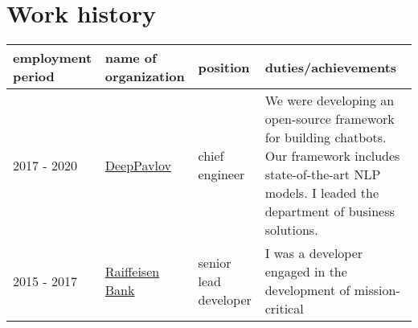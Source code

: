 \documentclass{article}
\begin{document}
\section{Work history}

\begin{longtable}[]{@{}llll@{}}
  \toprule
  \begin{minipage}[b]{0.22\columnwidth}\raggedright
    employment period\strut
  \end{minipage} & \begin{minipage}[b]{0.22\columnwidth}\raggedright
    name of organization\strut
  \end{minipage} & \begin{minipage}[b]{0.22\columnwidth}\raggedright
    position\strut
  \end{minipage} & \begin{minipage}[b]{0.22\columnwidth}\raggedright
    duties/achievements\strut
  \end{minipage}\tabularnewline
  \midrule
  \endhead
  \begin{minipage}[t]{0.22\columnwidth}\raggedright
    2017 - 2020\strut
  \end{minipage} & \begin{minipage}[t]{0.22\columnwidth}\raggedright
    \href{http://ipavlov.ai/}{DeepPavlov}\strut
  \end{minipage} & \begin{minipage}[t]{0.22\columnwidth}\raggedright
    chief engineer\strut
  \end{minipage} & \begin{minipage}[t]{0.22\columnwidth}\raggedright
    We were developing an open-source framework for building chatbots. Our
    framework includes state-of-the-art NLP models. I leaded the department
    of business solutions.\strut
  \end{minipage}\tabularnewline
  \begin{minipage}[t]{0.22\columnwidth}\raggedright
    2015 - 2017\strut
  \end{minipage} & \begin{minipage}[t]{0.22\columnwidth}\raggedright
    \href{https://www.raiffeisen.ru}{Raiffeisen Bank}\strut
  \end{minipage} & \begin{minipage}[t]{0.22\columnwidth}\raggedright
    senior lead developer\strut
  \end{minipage} & \begin{minipage}[t]{0.22\columnwidth}\raggedright
    I was a developer engaged in the development of mission-critical

\end{minipage}
\end{longtable}
\end{document}
